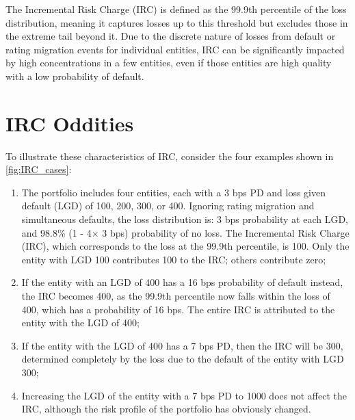\documentclass{article}
\begin{document}
The Incremental Risk Charge (IRC) is defined as the 99.9th percentile of the loss distribution, meaning it captures losses up to this threshold but excludes those in the extreme tail beyond it. Due to the discrete nature of losses from default or rating migration events for individual entities, IRC can be significantly impacted by high concentrations in a few entities, even if those entities are high quality with a low probability of default.

\section*{IRC Oddities}
To illustrate these characteristics of IRC, consider the four examples shown in
\autoref{fig:IRC_cases}:

\begin{enumerate}
\item The portfolio includes four entities, each with a 3 bps PD and loss given default (LGD) of 100, 200, 300, or 400. Ignoring rating migration and simultaneous defaults, the loss distribution is: 3 bps probability at each LGD, and 98.8\% (1 - 4$\times$ 3 bps) probability of no loss. The Incremental Risk Charge (IRC), which corresponds to the loss at the 99.9th percentile, is 100. Only the entity with LGD 100 contributes 100 to the IRC; others contribute zero;
\item If the entity with an LGD of 400 has a 16 bps probability of default instead, the IRC becomes 400, as the 99.9th percentile now falls within the loss of 400, which has a probability of 16 bps. The entire IRC is attributed to the entity with the LGD of 400;
\item If the entity with the LGD of 400 has a 7 bps PD, then the IRC will be 300, determined completely by the loss due to the default of the entity with LGD 300;
\item Increasing the LGD of the entity with a 7 bps PD to 1000 does not affect the IRC, although the risk profile of the portfolio has obviously changed.
\end{enumerate}
\end{document}
